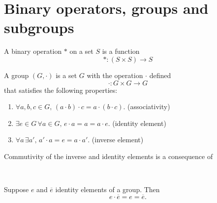 \documentclass{article}
\begin{document}
\section{Binary operators, groups and subgroups}
\begin{defi}
	A binary operation \(*\) on a set \(S\) is a function
	\begin{equation*}
		*:(S\times S)\rightarrow S
	\end{equation*}
\end{defi}
\begin{defi}[Group]
	A group \((G,\cdot)\) is a set \(G\) with the operation \(\cdot\) defined
	\begin{equation*}
		\cdot:G\times G\rightarrow G
	\end{equation*}
	that satisfies the following properties:
	\begin{enumerate}
		\item \(\forall a,b,c\in G,\,(a\cdot b)\cdot c=a\cdot(b\cdot c)\). (associativity)
		\item \(\exists e\in G\,\forall a\in G,\, e\cdot a=a=a\cdot e\). (identity element)
		\item \(\forall a\,\exists a',\,a'\cdot a=e=a\cdot a'\). (inverse element)
	\end{enumerate}
	Commutivity of the inverse and identity elements is a consequence of 
\end{defi}
\begin{thm}
	\,
	\begin{IEEEproof}
		Suppose \(e\) and \(\overline{e}\) identity elements of a group. Then
		\begin{equation*}
			e\cdot\overline{e}=e=\overline{e}.
		\end{equation*}
	\end{IEEEproof}
\end{thm}
\end{document}
